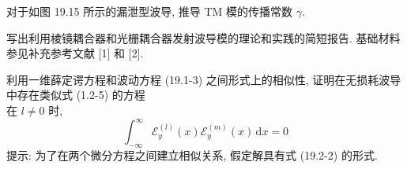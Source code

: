 \documentclass{note}
\begin{document}
\begin{exe}
    对于如图 19.15 所示的漏泄型波导, 推导 TM 模的传播常数 $\gamma$.
\end{exe}
\begin{sol}
\end{sol}

\begin{exe}
    写出利用棱镜耦合器和光栅耦合器发射波导模的理论和实践的简短报告. 基础材料参见补充参考文献 [1] 和 [2].
\end{exe}
\begin{sol}
\end{sol}

\begin{exe}
    利用一维薛定谔方程和波动方程 (19.1-3) 之间形式上的相似性, 证明在无损耗波导中存在类似式 (1.2-5) 的方程\\
    在 $l\neq 0$ 时,
    \[
        \int_{-\infty}^{\infty}\mathcal{E}_y^{(l)}(x)\mathcal{E}_y^{(m)}(x)\,\mathrm{d}x=0
    \]
    提示: 为了在两个微分方程之间建立相似关系, 假定解具有式 (19.2-2) 的形式.
\end{exe}
\end{document}
